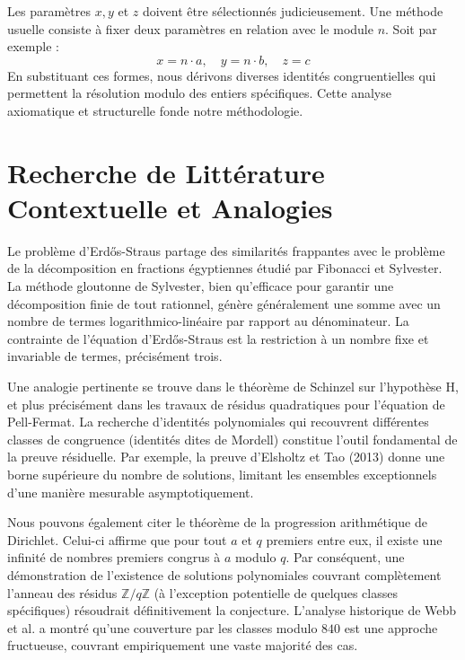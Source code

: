 \documentclass[11pt,a4paper]{article}
\theoremstyle{definition}
\theoremstyle{remark}
\begin{document}
Les param\`etres $x, y$ et $z$ doivent \^etre s\'electionn\'es judicieusement. Une m\'ethode usuelle consiste \`a fixer deux param\`etres en relation avec le module $n$. Soit par exemple :
\begin{equation}
x = n \cdot a, \quad y = n \cdot b, \quad z = c
\end{equation}
En substituant ces formes, nous d\'erivons diverses identit\'es congruentielles qui permettent la r\'esolution modulo des entiers sp\'ecifiques. Cette analyse axiomatique et structurelle fonde notre m\'ethodologie.
\section{Recherche de Litt\'erature Contextuelle et Analogies}

Le probl\`eme d'Erd\H{o}s-Straus partage des similarit\'es frappantes avec le probl\`eme de la d\'ecomposition en fractions \'egyptiennes \'etudi\'e par Fibonacci et Sylvester. La m\'ethode gloutonne de Sylvester, bien qu'efficace pour garantir une d\'ecomposition finie de tout rationnel, g\'en\`ere g\'en\'eralement une somme avec un nombre de termes logarithmico-lin\'eaire par rapport au d\'enominateur. La contrainte de l'\'equation d'Erd\H{o}s-Straus est la restriction \`a un nombre fixe et invariable de termes, pr\'ecis\'ement trois.

Une analogie pertinente se trouve dans le th\'eor\`eme de Schinzel sur l'hypoth\`ese H, et plus pr\'ecis\'ement dans les travaux de r\'esidus quadratiques pour l'\'equation de Pell-Fermat. La recherche d'identit\'es polynomiales qui recouvrent diff\'erentes classes de congruence (identit\'es dites de Mordell) constitue l'outil fondamental de la preuve r\'esiduelle. Par exemple, la preuve d'Elsholtz et Tao (2013) donne une borne sup\'erieure du nombre de solutions, limitant les ensembles exceptionnels d'une mani\`ere mesurable asymptotiquement.

Nous pouvons \'egalement citer le th\'eor\`eme de la progression arithm\'etique de Dirichlet. Celui-ci affirme que pour tout $a$ et $q$ premiers entre eux, il existe une infinit\'e de nombres premiers congrus \`a $a$ modulo $q$. Par cons\'equent, une d\'emonstration de l'existence de solutions polynomiales couvrant compl\`etement l'anneau des r\'esidus $\mathbb{Z}/q\mathbb{Z}$ (\`a l'exception potentielle de quelques classes sp\'ecifiques) r\'esoudrait d\'efinitivement la conjecture. L'analyse historique de Webb et al. a montr\'e qu'une couverture par les classes modulo $840$ est une approche fructueuse, couvrant empiriquement une vaste majorit\'e des cas.
\end{document}
